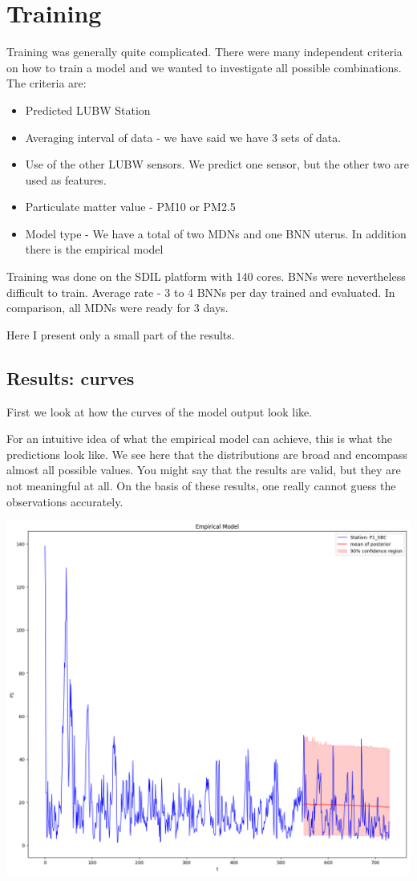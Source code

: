 \documentclass[margin=0.01in]{article}
\begin{document}
\section{Training}
\label{sec:org0fef8fa}
Training was generally quite complicated. There were many independent criteria on how to train a model and we wanted to investigate all possible combinations. The criteria are:
\begin{itemize}
\item Predicted LUBW Station
\item Averaging interval of data - we have said we have 3 sets of data.
\item Use of the other LUBW sensors. We predict one sensor, but the other two are used as features.
\item Particulate matter value - PM10 or PM2.5
\item Model type - We have a total of two MDNs and one BNN uterus. In addition there is the empirical model
\end{itemize}
Training was done on the SDIL platform with 140 cores. BNNs were nevertheless difficult to train. Average rate - 3 to 4 BNNs per day trained and evaluated. In comparison, all MDNs were ready for 3 days.

Here I present only a small part of the results.

\subsection{Results: curves}
\label{sec:org5c0016b}
First we look at how the curves of the model output look like.

For an intuitive idea of what the empirical model can achieve, this is what the predictions look like. We see here that the distributions are broad and encompass almost all possible values. You might say that the results are valid, but they are not meaningful at all. On the basis of these results, one really cannot guess the observations accurately.

\begin{center}
\includegraphics[width=.9\linewidth]{../images/12h/emp-12h.png}
\end{center}
\end{document}
